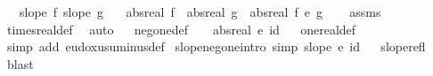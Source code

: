 \begin{isabellebody}
\ \ \ {\isachardoublequoteopen}slope\ f{\isachardoublequoteclose}\ {\isachardoublequoteopen}slope\ g{\isachardoublequoteclose}\isanewline
\ \ \ {\isachardoublequoteopen}abs{\isacharunderscore}{\kern0pt}real\ f\ {\isacharasterisk}{\kern0pt}\ abs{\isacharunderscore}{\kern0pt}real\ g\ {\isacharequal}{\kern0pt}\ abs{\isacharunderscore}{\kern0pt}real\ {\isacharparenleft}{\kern0pt}f\ {\isacharasterisk}{\kern0pt}\isactrlsub e\ g{\isacharparenright}{\kern0pt}{\isachardoublequoteclose}\isanewline
%
\isadelimproof
\ \ %
\endisadelimproof
%
\isatagproof
{}\isamarkupfalse%
\ assms\ \isamarkupfalse%
\ times{\isacharunderscore}{\kern0pt}real{\isacharunderscore}{\kern0pt}def\ \isamarkupfalse%
\ auto%
\endisatagproof
{\isafoldproof}%
%
\isadelimproof
\isanewline
%
\endisadelimproof
\isanewline
{}\isamarkupfalse%
%
\isadelimproof
\ %
\endisadelimproof
%
\isatagproof
\isacommand{{\isachardot}{\kern0pt}{\isachardot}{\kern0pt}}\isamarkupfalse%
%
\endisatagproof
{\isafoldproof}%
%
\isadelimproof
%
\endisadelimproof
\isanewline
{}\isamarkupfalse%
\isanewline
\isanewline
{}\isamarkupfalse%
\ neg{\isacharunderscore}{\kern0pt}one{\isacharunderscore}{\kern0pt}def{\isacharcolon}{\kern0pt}\ {\isachardoublequoteopen}{\isacharminus}{\kern0pt}\ {}\ {\isacharequal}{\kern0pt}\ abs{\isacharunderscore}{\kern0pt}real\ {\isacharparenleft}{\kern0pt}{\isacharminus}{\kern0pt}\isactrlsub e\ id{\isacharparenright}{\kern0pt}{\isachardoublequoteclose}%
\isadelimproof
\ %
\endisadelimproof
%
\isatagproof
{}\isamarkupfalse%
\ one{\isacharunderscore}{\kern0pt}real{\isacharunderscore}{\kern0pt}def\ \isamarkupfalse%
\ {\isacharparenleft}{\kern0pt}simp\ add{\isacharcolon}{\kern0pt}\ eudoxus{\isacharunderscore}{\kern0pt}uminus{\isacharunderscore}{\kern0pt}def{\isacharparenright}{\kern0pt}%
\endisatagproof
{\isafoldproof}%
%
\isadelimproof
%
\endisadelimproof
\isanewline
{}\isamarkupfalse%
\ slope{\isacharunderscore}{\kern0pt}neg{\isacharunderscore}{\kern0pt}one{\isacharbrackleft}{\kern0pt}intro{\isacharcomma}{\kern0pt}\ simp{\isacharbrackright}{\kern0pt}{\isacharcolon}{\kern0pt}\ {\isachardoublequoteopen}slope\ {\isacharparenleft}{\kern0pt}{\isacharminus}{\kern0pt}\isactrlsub e\ id{\isacharparenright}{\kern0pt}{\isachardoublequoteclose}%
\isadelimproof
\ %
\endisadelimproof
%
\isatagproof
{}\isamarkupfalse%
\ slope{\isacharunderscore}{\kern0pt}refl\ \isamarkupfalse%
\ blast%

\end{isabellebody}
